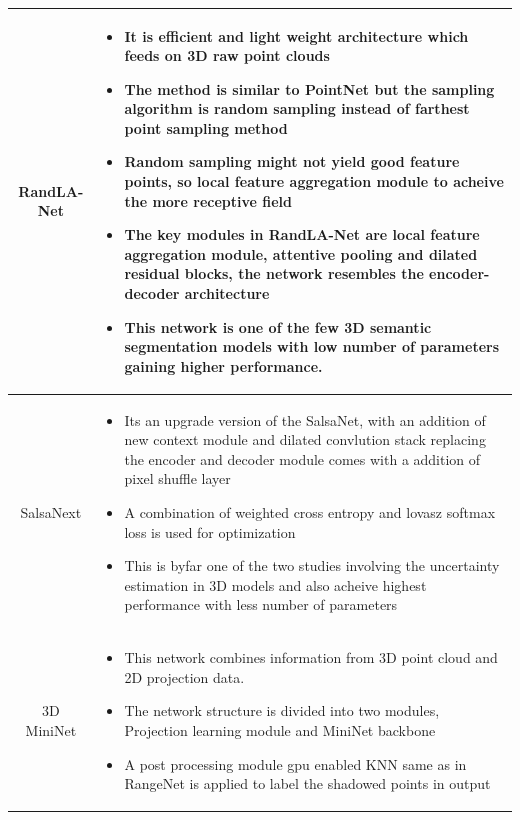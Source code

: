 \documentclass[12pt]{article}
\begin{document}
\begin{longtable}{|c|L|}
       RandLA-Net \cite{Randlanet} & \begin{itemize}
           \item It is efficient and light weight architecture which feeds on 3D raw point clouds
           \item The method is similar to PointNet but the sampling algorithm is random sampling instead of farthest point sampling method
           \item Random sampling might not yield good feature points, so local feature aggregation module to acheive the more receptive field
           \item The key modules in RandLA-Net are local feature aggregation module, attentive pooling and dilated residual blocks, the network resembles the encoder-decoder architecture
           \item This network is one of the few 3D semantic segmentation models with low number of parameters gaining higher performance.
       \end{itemize} \\ \hline
       
       SalsaNext \cite{salsanext} & \begin{itemize}
           \item Its an upgrade version of the SalsaNet, with an addition of new context module and dilated convlution stack replacing the encoder and decoder module comes with a addition of pixel shuffle layer
           \item A combination of weighted cross entropy and lovasz softmax loss is used for optimization
           \item This is byfar one of the two studies involving the uncertainty estimation in 3D models and also acheive highest performance with less number of parameters
       \end{itemize} \\ \hline
       
       3D MiniNet \cite{3dmininet} & \begin{itemize}
           \item This network combines information from 3D point cloud and 2D projection data.
           \item The network structure is divided into two modules, Projection learning module and MiniNet backbone
           \item A post processing module gpu enabled KNN same as in RangeNet is applied to label the shadowed points in output
       \end{itemize} \\ \hline
       

\end{longtable}
\end{document}
